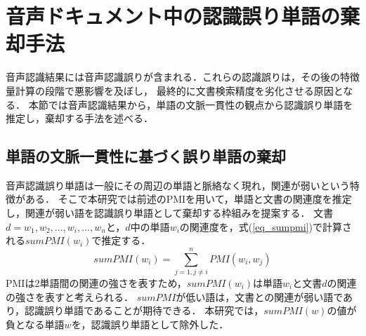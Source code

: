 %
\chapter{音声ドキュメント中の認識誤り単語の棄却手法}

音声認識結果には音声認識誤りが含まれる．これらの認識誤りは，その後の特徴量計算の段階で悪影響を及ぼし，
最終的に文書検索精度を劣化させる原因となる．
本節では音声認識結果から，単語の文脈一貫性の観点から認識誤り単語を推定し，棄却する手法を述べる．
%


\section{単語の文脈一貫性に基づく誤り単語の棄却}  \label{sec_word_rejection}
音声認識誤り単語は一般にその周辺の単語と脈絡なく現れ，関連が弱いという特徴がある．
そこで本研究では前述のPMIを用いて，単語と文書の関連度を推定し，関連が弱い語を認識誤り単語として棄却する枠組みを提案する．
文書$d = {w_1, w_2, ..., w_i, ..., w_n}$と，$d$中の単語$w_i$の関連度を，式(\ref{eq_sumpmi})で計算される$sumPMI(w_i)$で推定する．
\begin{equation}
    sumPMI(w_i) = \sum^{n}_{j=1, j \neq i}{PMI(w_i, w_j)}   \label{eq_sumpmi}
\end{equation}
PMIは2単語間の関連の強さを表すため，$sumPMI(w_i)$は単語$w_i$と文書$d$の関連の強さを表すと考えられる．
$sumPMI$が低い語は，文書との関連が弱い語であり，認識誤り単語であることが期待できる．
本研究では，$sumPMI(w)$の値が負となる単語$w$を，認識誤り単語として除外した．

